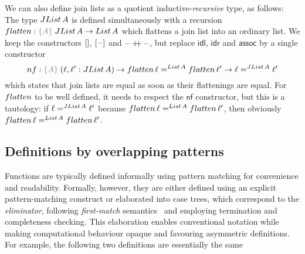 \documentclass[a4paper,UKenglish,numberwithinsect,cleveref,thm-restate]{lipics-v2021}
\begin{document}
We can also define join lists as a quotient inductive-\emph{recursive} type, as follows: The type $\JList{A}$ is defined simultaneously with a recursion $\flatten : \implicit{A}\;\JList{A} \to \List{A}$ which flattens a join list into an ordinary list. We keep the constructors $\Jnil$, $\Jsing{\blank}$ and $\mathord{\hspace{1pt}\text{--}\hspace{1pt}} \mathop{+\!\!+} \mathord{\hspace{1pt}\text{--}\hspace{1pt}}$, but replace $\mathsf{idl}$, $\mathsf{idr}$ and $\mathsf{assoc}$ by a single constructor
\[
  \mathsf{nf} : \implicit{A}\;(\ell, \ell' : \JList{A}) \to \flatten\,\ell =^{\mathsf{List}\,A} \flatten\,\ell' \to \ell =^{\JList{A}} \ell'
\]
which states that join lists are equal as soon as their flattenings are equal. For $\flatten$ to be well defined, it needs to respect the $\mathsf{nf}$ constructor, but this is a tautology: if $\ell =^{\JList{A}} \ell'$ because $\flatten\,\ell =^{\mathsf{List}\,A} \flatten\,\ell'$, then obviously $\flatten\,\ell =^{\mathsf{List}\,A} \flatten\,\ell'$.



\subsection{Definitions by overlapping patterns} \label{sec:meta:overlapping}
Functions are typically defined informally using pattern matching for convenience and readability. Formally, however, they are either defined using an explicit pattern-matching construct or elaborated into case trees, which correspond to the \emph{eliminator}, following \emph{first-match} semantics~\cite{Cockx2020a} and employing termination and completeness checking.
This elaboration enables conventional notation while making computational behaviour opaque and favouring asymmetric definitions.
For example, the following two definitions are essentially the same
\end{document}
